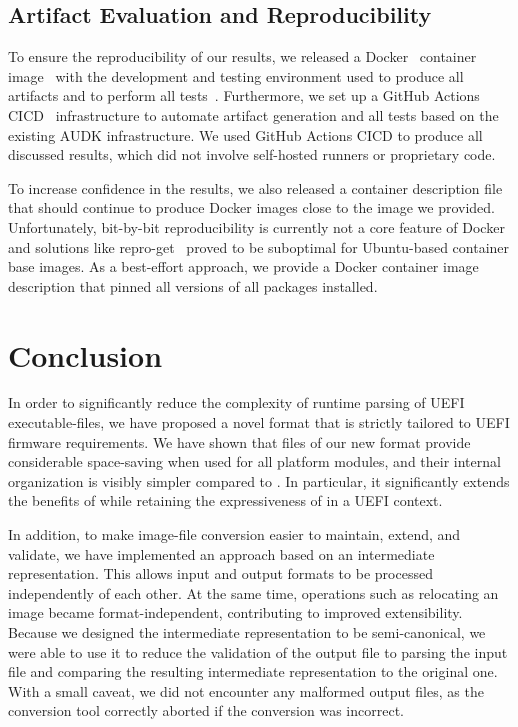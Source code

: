 





\section{Artifact Evaluation and Reproducibility}

To ensure the reproducibility of our results, we released a Docker~\cite{docker} container image~\cite{oci} with the development and testing environment used to produce all artifacts and to perform all tests~\cite{thesis-git}. Furthermore, we set up a GitHub Actions \gls{CICD}~\cite{gh-actions} infrastructure to automate artifact generation and all tests based on the existing \gls{AUDK} infrastructure. We used GitHub Actions \gls{CICD} to produce all discussed results, which did not involve self-hosted runners or proprietary code.

To increase confidence in the results, we also released a container description file that should continue to produce Docker images close to the image we provided. Unfortunately, bit-by-bit reproducibility is currently not a core feature of Docker and solutions like repro-get~\cite{repro-get} proved to be suboptimal for Ubuntu-based container base images. As a best-effort approach, we provide a Docker container image description that pinned all versions of all packages installed.

\chapter{Conclusion}
\label{chap:conclusion}

In order to significantly reduce the complexity of runtime parsing of \gls{UEFI} \glspl{executable-file}, we have proposed a novel format that is strictly tailored to \gls{UEFI} \gls{firmware} requirements. We have shown that files of our new format provide considerable space-saving when used for all platform modules, and their internal organization is visibly simpler compared to . In particular, it significantly extends the benefits of  while retaining the expressiveness of  in a \gls{UEFI} context.

In addition, to make \gls{image-file} conversion easier to maintain, extend, and validate, we have implemented an approach based on an intermediate representation. This allows input and output formats to be processed independently of each other. At the same time, operations such as relocating an \gls{image} became format-independent, contributing to improved extensibility. Because we designed the intermediate representation to be semi-canonical, we were able to use it to reduce the validation of the output file to parsing the input file and comparing the resulting intermediate representation to the original one. With a small caveat, we did not encounter any malformed output files, as the conversion tool correctly aborted if the conversion was incorrect.

